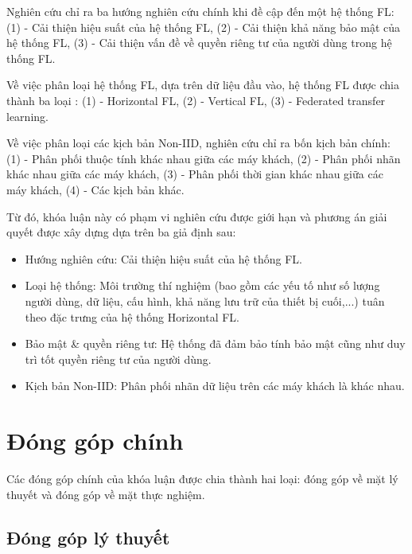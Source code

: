 Nghiên cứu \cite{yin2021comprehensive} chỉ ra ba hướng nghiên cứu chính khi đề cập đến một hệ thống FL: (1) - Cải thiện hiệu suất của hệ thống FL, (2) - Cải thiện khả năng bảo mật của hệ thống FL, (3) - Cải thiện vấn đề về quyền riêng tư của người dùng trong hệ thống FL.

Về việc phân loại hệ thống FL, dựa trên dữ liệu đầu vào, hệ thống FL được chia thành ba loại \cite{yin2021comprehensive}: (1) - Horizontal FL, (2) - Vertical FL, (3) - Federated transfer learning.

Về việc phân loại các kịch bản Non-IID, nghiên cứu \cite{zhu2021federated} chỉ ra bốn kịch bản chính: (1) - Phân phối thuộc tính khác nhau giữa các máy khách, (2) - Phân phối nhãn khác nhau giữa các máy khách, (3) - Phân phối thời gian khác nhau giữa các máy khách, (4) - Các kịch bản khác.

Từ đó, khóa luận này có phạm vi nghiên cứu được giới hạn và phương án giải quyết được xây dựng dựa trên ba giả định sau:

\begin{itemize}
    \item Hướng nghiên cứu: Cải thiện hiệu suất của hệ thống FL.
    \item Loại hệ thống: Môi trường thí nghiệm (bao gồm các yếu tố như số lượng người dùng, dữ liệu, cấu hình, khả năng lưu trữ của thiết bị cuối,...) tuân theo đặc trưng của hệ thống Horizontal FL.
    \item Bảo mật \& quyền riêng tư: Hệ thống đã đảm bảo tính bảo mật cũng như duy trì tốt quyền riêng tư của người dùng.
    \item Kịch bản Non-IID: Phân phối nhãn dữ liệu trên các máy khách là khác nhau.
\end{itemize}

\section{Đóng góp chính}

Các đóng góp chính của khóa luận được chia thành hai loại: đóng góp về mặt lý thuyết và đóng góp về mặt thực nghiệm.

\subsection{Đóng góp lý thuyết}

